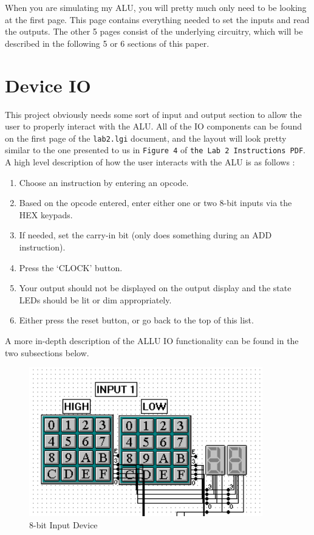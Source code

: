 \documentclass[a4paper,11pt]{article}
\begin{document}
When you are simulating my ALU, you will pretty much only need to be looking at the first page. This page contains everything needed to set the inputs and read the outputs. The other 5 pages consist of the underlying circuitry, which will be described in the following 5 or 6 sections of this paper.

\section{Device IO}
This project obviously needs some sort of input and output section to allow the user to properly interact with the ALU. All of the IO components can be found on the first page of the \texttt{lab2.lgi} document, and the layout will look pretty similar to the one presented to us in \texttt{Figure 4} of \texttt{the Lab 2 Instructions PDF}. A high level description of how the user interacts with the ALU is as follows :
\begin{enumerate}
\item Choose an instruction by entering an opcode. 
\item Based on the opcode entered, enter either one or two 8-bit inputs via the HEX keypads. 
\item If needed, set the carry-in bit (only does something during an ADD instruction).
\item Press the `CLOCK' button. 
\item Your output should not be displayed on the output display and the state LEDs should be lit or dim appropriately.
\item Either press the reset button, or go back to the top of this list.
\end{enumerate}

A more in-depth description of the ALLU IO functionality can be found in the two subsections below.

  \begin{figure}
       \includegraphics[width=4in]{pictures/8bitinput}
     \caption{8-bit Input Device}
     \label{fig:8bitinput}
  \end{figure} 
\end{document}
